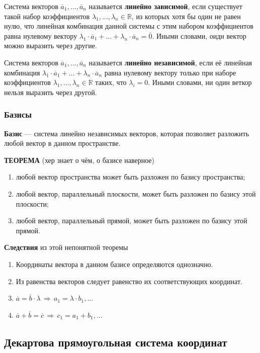 \documentclass{article}
\newcommand{\R}{\mathbb R}
\begin{document}
Система векторов $\overline{a}_1,\ldots,\overline{a}_n$ называется \textbf{линейно зависимой}, если существует такой набор коэффициентов $\lambda_1,\ldots,\lambda_n\in\R$, из которых хотя бы один не равен нулю, что линейная комбинация данной системы с этим набором коэффициентов равна нулевому вектору $\lambda_1\cdot\overline{a}_1+\ldots+\lambda_n\cdot\overline{a}_n=\overline{0}$. Иными словами, оидн вектор можно выразить через другие.

Система векторов $\overline{a}_1,\ldots,\overline{a}_n$ называется \textbf{линейно независимой}, если её линейная комбинация $\lambda_1\cdot\overline{a}_1+\ldots+\lambda_n\cdot\overline{a}_n$ равна нулевому вектору только при наборе коэффициентов $\lambda_1,\ldots,\lambda_n\in\R$ таких, что $\lambda_i=0$. Иными словами, ни один веткор нельзя выразить через другой.
\subsubsection{Базисы}
\textbf{Базис} — система линейно независимых векторов, которая позволяет разложить любой
вектор в данном пространстве.

\textbf{ТЕОРЕМА} (хер знает о чём, о базисе наверное)
\begin{enumerate}
    \item любой вектор пространства может быть разложен по базису пространства;
    \item любой вектор, параллельный плоскости, может быть разложен по базису этой плоскости;
    \item любой вектор, параллельный прямой, может быть разложен по базису этой прямой.
\end{enumerate}
\textbf{Следствия} из этой непонятной теоремы
\begin{enumerate}
    \item Координаты вектора в данном базисе определяются однозначно.
    \item Из равенства векторов следует равенство их соответствующих координат.
    \item $\overline{a}=\overline{b}\cdot\lambda\,\Rightarrow\,a_1=\lambda\cdot b_1,\ldots$
    \item $\overline{a}+\overline{b}=\overline{c}\,\Rightarrow\,c_1=a_1+b_1,\ldots$
\end{enumerate}
\newpage
\subsection{Декартова прямоугольная система координат}
\end{document}
